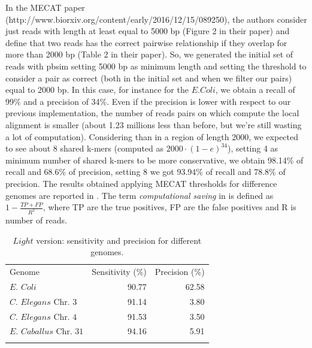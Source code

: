 \documentclass[11pt]{article}
\begin{document}
In the MECAT paper (http://www.biorxiv.org/content/early/2016/12/15/089250), the authors consider just reads with length at least equal to 5000 bp (Figure 2 in their paper) and define that two reads has the correct pairwise relationship if they overlap for more than 2000 bp (Table 2 in their paper).
So, we generated the initial set of reads with pbsim setting 5000 bp as minimum length and setting the threshold to consider a pair as correct (both in the initial set and when we filter our pairs) equal to 2000 bp.
In this case, for instance for the $E.Coli$, we obtain a recall of 99\% and a precision of 34\%. 
Even if the precision is lower with respect to our previous implementation, the number of reads pairs on which compute the local alignment is smaller (about 1.23 millions less than before, but we're still wasting a lot of computation).
Considering than in a region of length 2000, we expected to see about 8 shared k-mers (computed as $2000 \cdot (1-e)^{34}$), setting 4 as minimum number of shared k-mers to be more conservative, we obtain 98.14\% of recall and 68.6\% of precision, setting 8 we got 93.94\% of recall and 78.8\% of precision.
The results obtained applying MECAT thresholds for difference genomes are reported in .
The term \emph{computational saving} in  is defined as $1-\frac{TP+FP}{R^2}$, where TP are the true positives, FP are the false positives and R is number of reads.

\begin{table}
\centering
\begin{tabular}{lrr}
\hline %
\addlinespace[1ex] Genome & Sensitivity (\%) & Precision (\%) \\ 
\addlinespace[1ex]\hline %
\addlinespace[0.8ex] $E.$ $Coli$ & 90.77 & 62.58 \\ 
\addlinespace[0.8ex] $C.$ $Elegans$ Chr. $3$ & 91.14 & 3.80 \\
\addlinespace[0.8ex] $C.$ $Elegans$ Chr. $4$ & 91.53 & 3.50 \\
\addlinespace[0.8ex] $E.$ $Caballus$ Chr. $31$ & 94.16 & 5.91 \\
\addlinespace[1ex]\hline
\end{tabular}
\caption{$Light$ version: sensitivity and precision for different genomes.}
\label{table:met}
\end{table}
\end{document}
